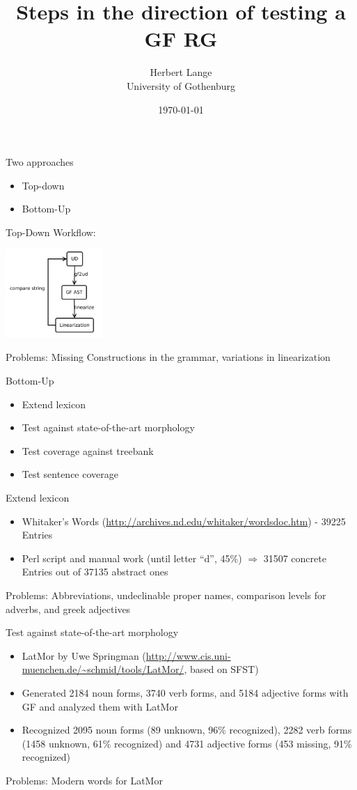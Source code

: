 \documentclass{beamer}
\title[The Latin Language Ressource Grammar]{Steps in the direction of testing a GF RG}
\author{Herbert Lange\\University of Gothenburg}
\date{\today}
\begin{document}
\frame{\titlepage}

\begin{frame}
  Two approaches
  \begin{itemize}
    \item Top-down
    \item  Bottom-Up
  \end{itemize}
\end{frame}
\begin{frame}{Top-Down}
  Workflow:
  
  \includegraphics[width=10em]{ud.pdf}

  Problems: Missing Constructions in the grammar, variations in linearization
\end{frame}
\begin{frame}{Bottom-Up}
  \begin{itemize}
  \item Extend lexicon
  \item Test against state-of-the-art morphology
  \item Test coverage against treebank
  \item Test sentence coverage
  \end{itemize}
\end{frame}
\begin{frame}{Extend lexicon}
    \begin{itemize}
    \item Whitaker's Words (\url{http://archives.nd.edu/whitaker/wordsdoc.htm}) - 39225 Entries
    \item Perl script and manual work (until letter ``d'', 45\%) $\Rightarrow$  31507 concrete Entries out of 37135 abstract ones
    \end{itemize}
    Problems: Abbreviations, undeclinable proper names, comparison levels for adverbs, and greek adjectives
\end{frame}
\begin{frame}{Test against state-of-the-art morphology}
    \begin{itemize}
    \item LatMor by Uwe Springman (\url{http://www.cis.uni-muenchen.de/~schmid/tools/LatMor/}, based on SFST)
    \item Generated 2184 noun forms, 3740 verb forms, and 5184 adjective forms with GF and analyzed them with LatMor
    \item Recognized 2095 noun forms (89 unknown, 96\% recognized), 2282 verb forms (1458 unknown, 61\% recognized) and 4731 adjective forms (453 missing, 91\% recognized)
    \end{itemize}
    Problems: Modern words for LatMor
\end{frame}
\end{document}
